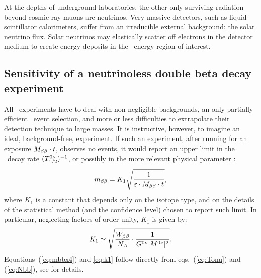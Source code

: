 At the depths of underground laboratories, the other only surviving radiation beyond cosmic-ray muons are neutrinos. Very massive detectors, such as liquid-scintillator calorimeters, suffer from an irreducible external background: the solar neutrino flux. Solar neutrinos may elastically scatter off electrons in the detector medium to create energy deposits in the \bbonu\ energy region of interest.


\subsection{Sensitivity of a neutrinoless double beta decay experiment} \label{subsec:sensitivitydefinition}

All \bbonu\ experiments have to deal with non-negligible backgrounds, an only partially efficient \bbonu\ event selection, and more or less difficulties to extrapolate their detection technique to large masses. It is instructive, however, to imagine an ideal, background-free, experiment. If such an experiment, after running for an exposure $M_{\beta\beta}\cdot t$, observes no events, it would report an upper limit in the \bbonu\ decay rate $(T^{0\nu}_{1/2})^{-1}$, or possibly in the more relevant physical parameter \mbb:
%
\begin{equation}
m_{\beta\beta} = K_{1} \sqrt{\frac{1}{\varepsilon\cdot M_{\beta\beta} \cdot t}}, \label{eq:mbbx4}
\end{equation}
%
where $K_{1}$ is a constant that depends only on the isotope type, and on the details of the statistical method (and the confidence level) chosen to report such limit. In particular, neglecting factors of order unity, $K_{1}$ is given by:
%
\begin{equation}
K_{1} \simeq \sqrt{\frac{W_{\beta\beta}}{N_A}\cdot \frac{1}{G^{0\nu}\lvert M^{0\nu}\rvert^2}}. \label{eq:k1}
\end{equation}
%
Equations~(\ref{eq:mbbx4}) and \ref{eq:k1} follow directly from eqs.~(\ref{eq:Tonu}) and (\ref{eq:Nbb}), see \cite{Gomez-Cadenas:2010zcc} for details.

